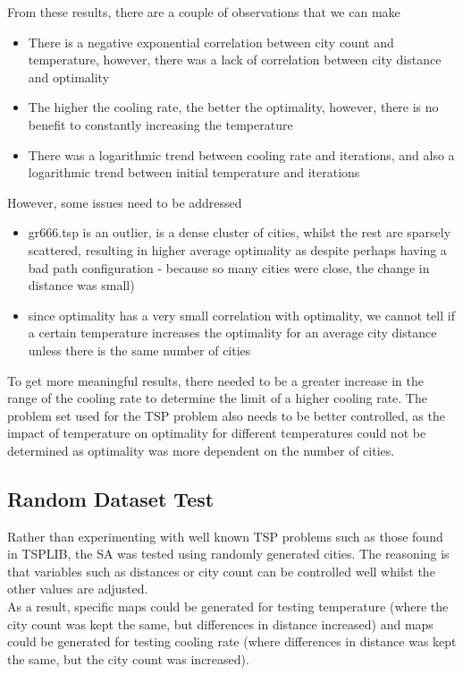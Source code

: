 \documentclass{article}
\begin{document}
From these results, there are a couple of observations that we can make
\begin{itemize}
    \item There is a negative exponential correlation between city count and temperature, however, there was a lack of correlation between city distance and optimality
    \item The higher the cooling rate, the better the optimality, however, there is no benefit to constantly increasing the temperature
    \item There was a logarithmic trend between cooling rate and iterations, and also a logarithmic trend between initial temperature and iterations
\end{itemize}

However, some issues need to be addressed
\begin{itemize}
    \item gr666.tsp is an outlier, is a dense cluster of cities, whilst the rest are sparsely scattered, resulting in higher average optimality as despite perhaps having a bad path configuration - because so many cities were close, the change in distance was small)
    \item since optimality has a very small correlation with optimality, we cannot tell if a certain temperature increases the optimality for an average city distance unless there is the same number of cities
\end{itemize}

To get more meaningful results, there needed to be a greater increase in the range of the cooling rate to determine the limit of a higher cooling rate.
The problem set used for the TSP problem also needs to be better controlled, as the impact of temperature on optimality for different temperatures could not be determined as optimality was more dependent on the number of cities.

\newpage
\subsection{Random Dataset Test}

Rather than experimenting with well known TSP problems such as those found in TSPLIB, the SA was tested using randomly generated cities.
The reasoning is that variables such as distances or city count can be controlled well whilst the other values are adjusted.
\\

As a result, specific maps could be generated for testing temperature (where the city count was kept the same, but differences in distance increased) and maps could be generated for testing cooling rate (where differences in distance was kept the same, but the city count was increased).
\\
\end{document}
